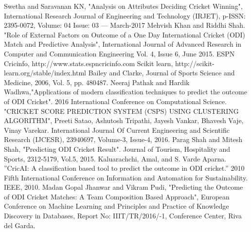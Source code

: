 \documentclass[a4paper, 10pt, conference]{IEEEtran}
\begin{document}
\begin{thebibliography}{99}

 Swetha and Saravanan KN, "Analysis on Attributes Deciding Cricket Winning", International Research Journal of Engineering and Technology (IRJET), p-ISSN: 2395-0072, Volume: 04 Issue: 03 — March-2017
 Mehvish Khan and Riddhi Shah. "Role of External Factors on Outcome of a One Day International Cricket (ODI) Match and Predictive Analysis", International Journal of Advanced Research in Computer and Communication Engineering Vol. 4, Issue 6, June 2015.
 ESPN Cricinfo, http://www.stats.espncricinfo.com
 Scikit learn, http://scikit-learn.org/stable/index.html
 Bailey and Clarke, Journal of Sports Science and Medicine, 2006, Vol. 5, pp. 480487.
 Neeraj Pathak and Hardik Wadhwa,"Applications of modern classification techniques to predict the outcome of ODI Cricket". 2016 International Conference on Computational Science.
 "CRICKET SCORE PREDICTION SYSTEM (CSPS) USING CLUSTERING ALGORITHM", Preeti Satao, Ashutosh Tripathi, Jayesh Vankar, Bhavesh Vaje, Vinay Varekar.  International Journal Of Current Engineering and Scientiﬁc Research (IJCESR), 23940697, Volume-3, Issue-4, 2016.
 Parag Shah and Mitesh Shah, "Predicting ODI Cricket Result". Journal of Tourism, Hospitality and Sports, 2312-5179, Vol.5, 2015.
 Kaluarachchi, Amal, and S. Varde Aparna. ”CricAI: A classiﬁcation based tool to predict the outcome in ODI cricket.” 2010 Fifth International Conference on Information and Automation for Sustainability. IEEE, 2010.
  Madan Gopal Jhanwar and Vikram Pudi, "Predicting the Outcome of ODI Cricket Matches: A Team Composition Based Approach", European Conference on Machine Learning and Principles and Practice of Knowledge Discovery in Databases, Report No: IIIT/TR/2016/-1, Conference Center, Riva del Garda.

\end{thebibliography}
\end{document}
